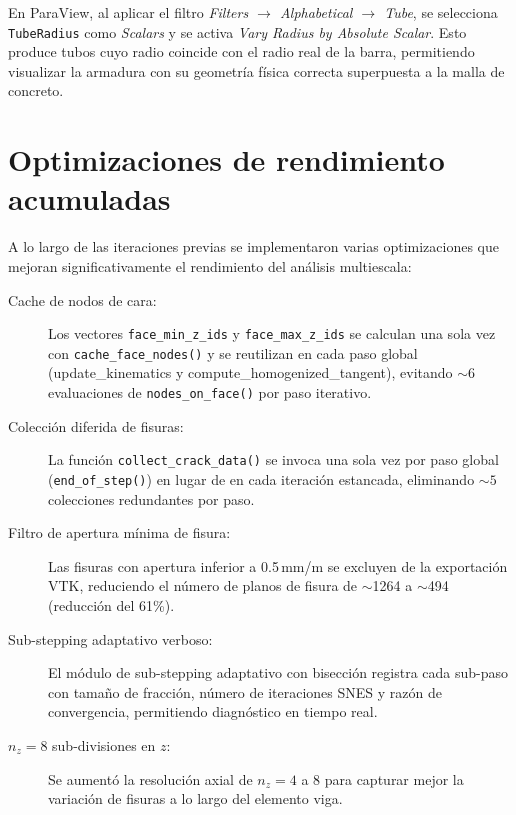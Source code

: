 En ParaView, al aplicar el filtro \textit{Filters $\to$
Alphabetical $\to$ Tube}, se selecciona \texttt{TubeRadius} como
\emph{Scalars} y se activa \emph{Vary Radius by Absolute Scalar}.
Esto produce tubos cuyo radio coincide con el radio real de la barra,
permitiendo visualizar la armadura con su geometría física correcta
superpuesta a la malla de concreto.


\section{Optimizaciones de rendimiento acumuladas}
\label{sec:emb-performance}

A lo largo de las iteraciones previas se implementaron varias
optimizaciones que mejoran significativamente el rendimiento del
análisis multiescala:

\begin{description}
  \item[Cache de nodos de cara:]
    Los vectores \texttt{face\_min\_z\_ids} y
    \texttt{face\_max\_z\_ids} se calculan una sola vez con
    \texttt{cache\_face\_nodes()} y se reutilizan en cada paso
    global (update\_kinematics y compute\_homogenized\_tangent),
    evitando ${\sim}6$ evaluaciones de \texttt{nodes\_on\_face()}
    por paso iterativo.

  \item[Colección diferida de fisuras:]
    La función \texttt{collect\_crack\_data()} se invoca una sola
    vez por paso global (\texttt{end\_of\_step()}) en lugar de en
    cada iteración estancada, eliminando ${\sim}5$ colecciones
    redundantes por paso.

  \item[Filtro de apertura mínima de fisura:]
    Las fisuras con apertura inferior a 0{.}5\,mm/m se excluyen de
    la exportación VTK, reduciendo el número de planos de fisura de
    $\sim$1264 a $\sim$494 (reducción del 61\%).

  \item[Sub-stepping adaptativo verboso:]
    El módulo de sub-stepping adaptativo con bisección registra
    cada sub-paso con tamaño de fracción, número de iteraciones
    SNES y razón de convergencia, permitiendo diagnóstico en tiempo
    real.

  \item[$n_z = 8$ sub-divisiones en $z$:]
    Se aumentó la resolución axial de $n_z = 4$ a 8 para capturar
    mejor la variación de fisuras a lo largo del elemento viga.
\end{description}


